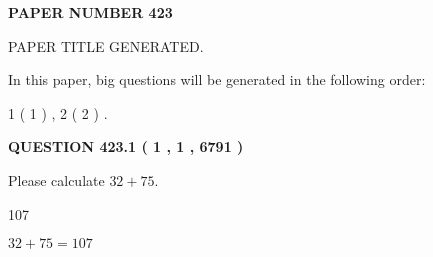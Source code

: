 \documentclass[12pt]{article}
\begin{document}
   
   
   
\newpage 
\setcounter{page}{ 
   423001 } 
   
   
   
   
 {\textbf{ \Large{ PAPER NUMBER  423  }}}
   
   
\vspace{0.2in}
   
   
   
   
   
   
   
   
 \vspace{0.2in}
 
 
 
 
   
   
 PAPER TITLE GENERATED.
   
   
   
\vspace{0.2in}
   
In this paper, big questions will be generated in the following order: 
   
   
   1 ( 1 )
 ,
   2 ( 2 )
 .
  
\vspace{0.2in}
  
{\textbf{\Large{QUESTION
423.1 
 ( 1 , 1 , 6791 )
}}}
  
  
 
Please calculate $ %
32 +  %
75 $.
 
 
 
\noindent{}
 
 

107
 
 
\noindent{}
 
 

 
 
 
\noindent{}
 
 

$ %
32 +  %
75=   %
107$
 
 
\noindent{}
 
 

 
   
   
   
\end{document}
